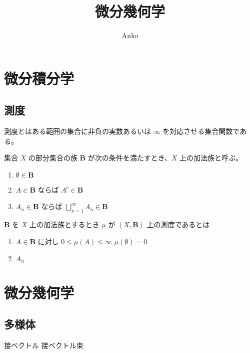 \documentclass[uplatex,dvipdfmx,a4paper,11pt]{jlreq}
\title{微分幾何学}
\author{Anko}
\theoremstyle{definition}
\begin{document}
\maketitle
\tableofcontents
\clearpage

\section{微分積分学}
\subsection{測度}
測度とはある範囲の集合に非負の実数あるいは $\infty$ を対応させる集合関数である。
\begin{definition}[加法族]
  集合 $X$ の部分集合の族 $\bm{B}$ が次の条件を満たすとき、$X$ 上の加法族と呼ぶ。
  \begin{enumerate}
    \item $\emptyset\in\bm{B}$
    \item $A\in\bm{B}$ ならば $A^c\in\bm{B}$
    \item $A_n\in\bm{B}$ ならば $\bigcup_{n=1}^\infty A_n\in\bm{B}$
  \end{enumerate}
\end{definition}
\begin{definition}[測度]
  $\bm{B}$ を $X$ 上の加法族とするとき $\mu$ が $(X, \bm{B})$ 上の測度であるとは
  \begin{enumerate}
    \item $A\in\bm{B}$ に対し $0\leq \mu(A)\leq\infty$ $\mu(\emptyset) = 0$
    \item $A_n$
  \end{enumerate}
\end{definition}

\section{微分幾何学}
\subsection{多様体}
接ベクトル
接ベクトル束
\end{document}
